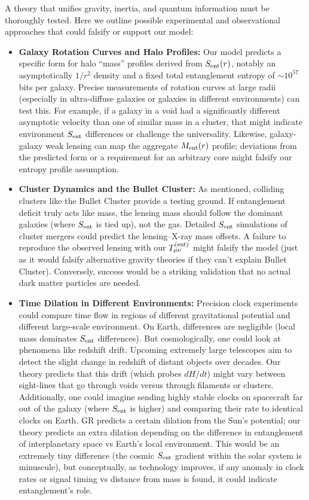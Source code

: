 \documentclass[11pt]{article}
\begin{document}
A theory that unifies gravity, inertia, and quantum information must be thoroughly tested. Here we outline possible experimental and observational approaches that could falsify or support our model:
\begin{itemize}
    \item \textbf{Galaxy Rotation Curves and Halo Profiles:} Our model predicts a specific form for halo “mass” profiles derived from $S_{\rm ent}(r)$, notably an asymptotically $1/r^2$ density and a fixed total entanglement entropy of $\sim 10^{57}$ bits per galaxy. Precise measurements of rotation curves at large radii (especially in ultra-diffuse galaxies or galaxies in different environments) can test this. For example, if a galaxy in a void had a significantly different asymptotic velocity than one of similar mass in a cluster, that might indicate environment $S_{\rm ent}$ differences or challenge the universality. Likewise, galaxy-galaxy weak lensing can map the aggregate $M_{\rm ent}(r)$ profile; deviations from the predicted form or a requirement for an arbitrary core might falsify our entropy profile assumption.

    \item \textbf{Cluster Dynamics and the Bullet Cluster:} As mentioned, colliding clusters like the Bullet Cluster provide a testing ground. If entanglement deficit truly acts like mass, the lensing mass should follow the dominant galaxies (where $S_{\rm ent}$ is tied up), not the gas. Detailed $S_{\rm ent}$ simulations of cluster mergers could predict the lensing–X-ray mass offsets. A failure to reproduce the observed lensing with our $T_{\mu\nu}^{\rm (ent)}$ might falsify the model (just as it would falsify alternative gravity theories if they can’t explain Bullet Cluster). Conversely, success would be a striking validation that no actual dark matter particles are needed.

    \item \textbf{Time Dilation in Different Environments:} Precision clock experiments could compare time flow in regions of different gravitational potential and different large-scale environment. On Earth, differences are negligible (local mass dominates $S_{\rm ent}$ differences). But cosmologically, one could look at phenomena like redshift drift. Upcoming extremely large telescopes aim to detect the slight change in redshift of distant objects over decades. Our theory predicts that this drift (which probes $dH/dt$) might vary between sight-lines that go through voids versus through filaments or clusters​. Additionally, one could imagine sending highly stable clocks on spacecraft far out of the galaxy (where $S_{\rm ent}$ is higher) and comparing their rate to identical clocks on Earth. GR predicts a certain dilation from the Sun’s potential; our theory predicts an extra dilation depending on the difference in entanglement of interplanetary space vs Earth’s local environment. This would be an extremely tiny difference (the cosmic $S_{\rm ent}$ gradient within the solar system is minuscule), but conceptually, as technology improves, if any anomaly in clock rates or signal timing vs distance from mass is found, it could indicate entanglement’s role.


\end{itemize}
\end{document}
